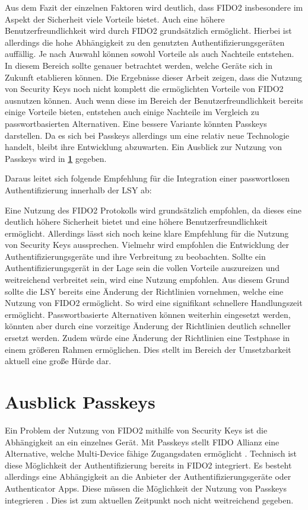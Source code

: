 Aus dem Fazit der einzelnen Faktoren wird deutlich, dass \ac{FIDO}2 insbesondere im Aspekt der Sicherheit viele Vorteile bietet. Auch eine höhere Benutzerfreundlichkeit wird durch \ac{FIDO}2 grundsätzlich ermöglicht. Hierbei ist allerdings die hohe Abhängigkeit zu den genutzten Authentifizierungsgeräten auffällig. Je nach Auswahl können sowohl Vorteile als auch Nachteile entstehen. In diesem Bereich sollte genauer betrachtet werden, welche Geräte sich in Zukunft etablieren können. Die Ergebnisse dieser Arbeit zeigen, dass die Nutzung von Security Keys noch nicht komplett die ermöglichten Vorteile von \ac{FIDO}2 ausnutzen können. Auch wenn diese im Bereich der Benutzerfreundlichkeit bereits einige Vorteile bieten, entstehen auch einige Nachteile im Vergleich zu passwortbasierten Alternativen. Eine bessere Variante könnten Passkeys darstellen. Da es sich bei Passkeys allerdings um eine relativ neue Technologie handelt, bleibt ihre Entwicklung abzuwarten. Ein Ausblick zur Nutzung von Passkeys wird in \textbf{\ref{passkeys}} gegeben.

Daraus leitet sich folgende Empfehlung für die Integration einer passwortlosen Authentifizierung innerhalb der \ac{LSY} ab:

Eine Nutzung des \ac{FIDO}2 Protokolls wird grundsätzlich empfohlen, da dieses eine deutlich höhere Sicherheit bietet und eine höhere Benutzerfreundlichkeit ermöglicht. Allerdings lässt sich noch keine klare Empfehlung für die Nutzung von Security Keys aussprechen. Vielmehr wird empfohlen die Entwicklung der Authentifizierungsgeräte und ihre Verbreitung zu beobachten. Sollte ein Authentifizierungsgerät in der Lage sein die vollen Vorteile auszureizen und weitreichend verbreitet sein, wird eine Nutzung empfohlen. Aus diesem Grund sollte die \ac{LSY} bereits eine Änderung der Richtlinien vornehmen, welche eine Nutzung von \ac{FIDO}2 ermöglicht. So wird eine signifikant schnellere Handlungszeit ermöglicht. Passwortbasierte Alternativen können weiterhin eingesetzt werden, könnten aber durch eine vorzeitige Änderung der Richtlinien deutlich schneller ersetzt werden. Zudem würde eine Änderung der Richtlinien eine Testphase in einem größeren Rahmen ermöglichen. Dies stellt im Bereich der Umsetzbarkeit aktuell eine große Hürde dar.


\chapter{Ausblick Passkeys} \label{passkeys}
Ein Problem der Nutzung von \ac{FIDO}2 mithilfe von Security Keys ist die Abhängigkeit an ein einzelnes Gerät. Mit Passkeys stellt \ac{FIDO} Allianz eine Alternative, welche Multi-Device fähige Zugangsdaten ermöglicht \cite{usecasfido}.
Technisch ist diese Möglichkeit der Authentifizierung bereits in \ac{FIDO}2 integriert. Es besteht allerdings eine Abhängigkeit an die Anbieter der Authentifizierungsgeräte oder Authenticator Apps. Diese müssen die Möglichkeit der Nutzung von Passkeys integrieren \cite{usecasfido}. Dies ist zum aktuellen Zeitpunkt noch nicht weitreichend gegeben.

